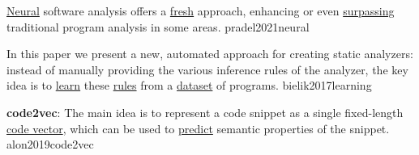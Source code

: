 \documentclass{article}
\begin{document}


  {\ul{Neural} software analysis offers a \ul{fresh} approach, enhancing or even \ul{surpassing} traditional program analysis in some areas.}
  {pradel2021neural}

  {In this paper we present a new, automated approach for creating static analyzers: instead of manually providing the various inference rules of the analyzer, the key idea is to \ul{learn} these \ul{rules} from a \ul{dataset} of programs.}
  {bielik2017learning}

  {\textbf{code2vec}: The main idea is to represent a code snippet as a single fixed-length \ul{code vector}, which can be used to \ul{predict} semantic properties of the snippet.}
  {alon2019code2vec}
\end{document}
